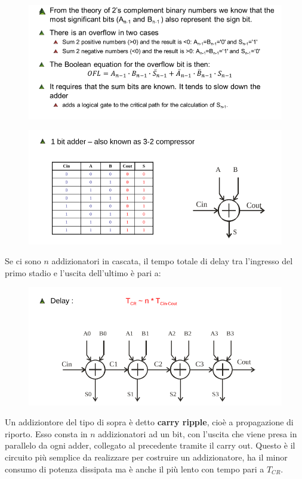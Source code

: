 \documentclass{book}
\begin{document}
        \begin{figure}[h!]
            \centering
            \includegraphics[width=0.75\linewidth]{img/chapt10img2.png}
        \end{figure}
        \begin{figure}[h!]
            \centering
            \includegraphics[width=0.75\linewidth]{img/chapt10img3.png}
        \end{figure}
        \newpage
        Se ci sono $n$ addizionatori in cascata, il tempo totale di delay tra l'ingresso del primo stadio e l'uscita dell'ultimo è pari a:
        \begin{figure}[h!]
            \centering
            \includegraphics[width=0.75\linewidth]{img/chapt10img4.png}
        \end{figure}
        Un addiziontore del tipo di sopra è detto \textbf{carry ripple}, cioè a propagazione di riporto. Esso consta in $n$ addizionatori ad un bit, con l'uscita che viene presa in parallelo da ogni adder, collegato al precedente tramite il carry out. Questo è il circuito più semplice da realizzare per costruire un addizionatore, ha il minor consumo di potenza dissipata ma è anche il più lento con tempo pari a $T_{CR}$.
\end{document}
